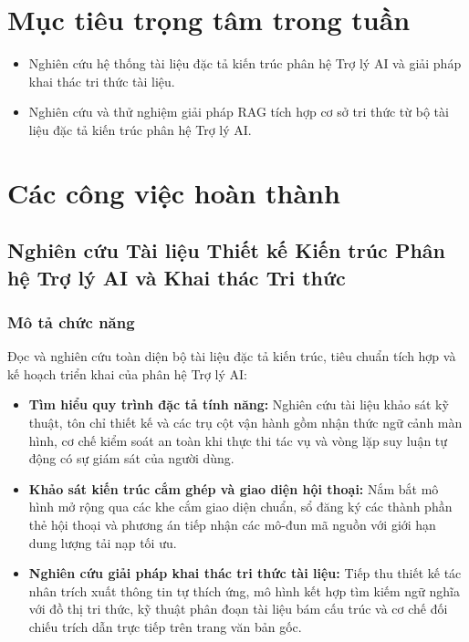 \section{Mục tiêu trọng tâm trong tuần}
\begin{itemize}
    \item Nghiên cứu hệ thống tài liệu đặc tả kiến trúc phân hệ Trợ lý AI và giải pháp khai thác tri thức tài liệu.
    \item Nghiên cứu và thử nghiệm giải pháp RAG tích hợp cơ sở tri thức từ bộ tài liệu đặc tả kiến trúc phân hệ Trợ lý AI.
\end{itemize}

\section{Các công việc hoàn thành}

\subsection{Nghiên cứu Tài liệu Thiết kế Kiến trúc Phân hệ Trợ lý AI và Khai thác Tri thức}

\subsubsection{Mô tả chức năng}
Đọc và nghiên cứu toàn diện bộ tài liệu đặc tả kiến trúc, tiêu chuẩn tích hợp và kế hoạch triển khai của phân hệ Trợ lý AI:
\begin{itemize}
    \item \textbf{Tìm hiểu quy trình đặc tả tính năng:} Nghiên cứu tài liệu khảo sát kỹ thuật, tôn chỉ thiết kế và các trụ cột vận hành gồm nhận thức ngữ cảnh màn hình, cơ chế kiểm soát an toàn khi thực thi tác vụ và vòng lặp suy luận tự động có sự giám sát của người dùng.
    \item \textbf{Khảo sát kiến trúc cắm ghép và giao diện hội thoại:} Nắm bắt mô hình mở rộng qua các khe cắm giao diện chuẩn, sổ đăng ký các thành phần thẻ hội thoại và phương án tiếp nhận các mô-đun mã nguồn với giới hạn dung lượng tải nạp tối ưu.
    \item \textbf{Nghiên cứu giải pháp khai thác tri thức tài liệu:} Tiếp thu thiết kế tác nhân trích xuất thông tin tự thích ứng, mô hình kết hợp tìm kiếm ngữ nghĩa với đồ thị tri thức, kỹ thuật phân đoạn tài liệu bám cấu trúc và cơ chế đối chiếu trích dẫn trực tiếp trên trang văn bản gốc.
\end{itemize}

